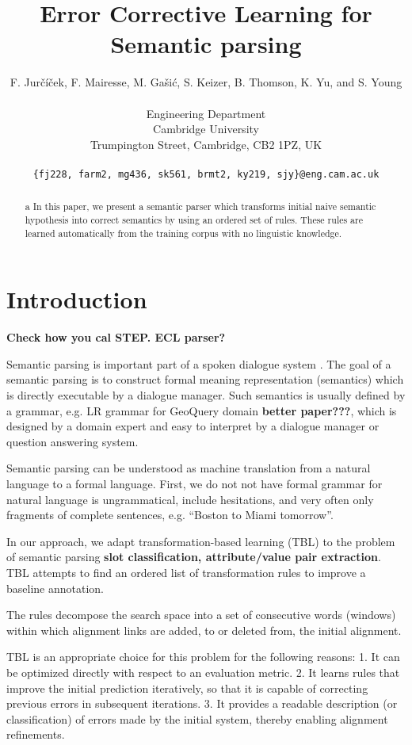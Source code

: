 \documentclass[11pt]{article}
\title{Error Corrective Learning for Semantic parsing}
\author{F. Jur\v{c}\'{i}\v{c}ek, F. Mairesse, M. Ga\v{s}i\'{c}, S. Keizer, B. Thomson, K. Yu, and S. Young \\
\\
Engineering Department \\
Cambridge University \\
Trumpington Street, Cambridge, CB2 1PZ, UK \\
\\
{\tt \{fj228, farm2, mg436, sk561, brmt2, ky219, sjy\}@eng.cam.ac.uk}
}
\date{}
\begin{document}
\maketitle
\begin{abstract}a
  In this paper, we present a semantic parser which transforms initial naive semantic hypothesis into correct semantics by using an ordered set of rules. These rules are learned automatically from the training corpus with no linguistic knowledge.
\end{abstract}

\section{Introduction}

\textbf{Check how you cal STEP. ECL parser?}

Semantic parsing is important part of a spoken dialogue system \cite{williams07,thomson08}. The goal of a semantic parsing is to construct formal meaning representation (semantics) which is directly executable by a dialogue manager. Such semantics is usually defined by a grammar, e.g. LR grammar for GeoQuery domain \cite{wong06} \textbf{better paper???}, which is designed by a domain expert and easy to interpret by a dialogue manager or question answering system.

Semantic parsing can be understood as machine translation from a natural language to a formal language. First, we do not not have formal grammar for natural language is ungrammatical, include hesitations, and very often only fragments of complete sentences, e.g. ``Boston to Miami tomorrow''. 

In our approach, we adapt transformation-based
learning (TBL) \cite{brill95} to the problem
of semantic parsing \textbf{slot classification, attribute/value pair extraction}. TBL attempts to find an
ordered list of transformation rules to improve a baseline annotation.

The rules decompose the search space into
a set of consecutive words (windows) within which
alignment links are added, to or deleted from, the
initial alignment. 

TBL is an appropriate choice for this problem for
the following reasons:
1. It can be optimized directly with respect to an
evaluation metric.
2. It learns rules that improve the initial prediction
iteratively, so that it is capable of correcting
previous errors in subsequent iterations.
3. It provides a readable description (or classification)
of errors made by the initial system,
thereby enabling alignment refinements.
\end{document}
